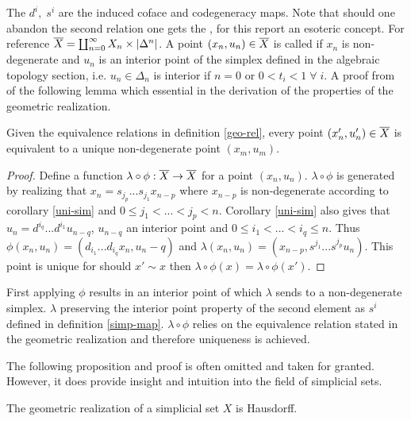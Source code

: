 \documentclass[../../main.tex]{subfiles}
\begin{document}
    The $d^i,\; s^i$ are the induced coface and codegeneracy maps. Note that should one abandon the second relation one gets the , for this report an esoteric concept. For reference $\bigGeom X = \coprod_{n=0}^{\infty} X_n \times \geom[\Delta^n]$. A point $(x_n,u_n)\in \bigGeom X$ is called  if $x_n$ is non-degenerate and $u_n$ is an interior point of the simplex defined in the algebraic topology section, i.e. $u_n\in \Delta_n$ is interior if $ n=0$ or $ 0< t_i < 1 \;\forall\; i$. A proof from \cite{simp-maye} of the following lemma which essential in the derivation of the properties of the geometric realization.

    \begin{lemma}\label{deg-rep}
        Given the equivalence relations in definition \ref{geo-rel}, every point $\left(x_n',u_n'\right)\in\bigGeom X$ is equivalent to a unique non-degenerate point $\left(x_m,u_m\right)$.
    \end{lemma}

    \begin{proof}    
        Define a function $\lambda\circ\phi:\bigGeom X \to \bigGeom X$ for a point $(x_n,u_n)$. $\lambda\circ\phi$ is generated by realizing that $x_n=s_{j_p}...s_{j_1}x_{n-p}$ where $x_{n-p}$ is non-degenerate according to corollary \ref{uni-sim} and $0\leq j_1<...<j_p<n$. Corollary \ref{uni-sim} also gives that $u_n=d^{i_q}...d^{i_1}u_{n-q}$, $u_{n-q}$ an interior point and $0\leq i_1<...<i_q\leq n$. Thus $\phi(x_n,u_n)=(d_{i_1}...d_{i_q}x_n,u_n-q)$ and $\lambda(x_n,u_n)=(x_{n-p},s^{j_1}...s^{j_p}u_n)$. This point is unique for should $x'\sim x$ then $\lambda\circ\phi(x)=\lambda\circ\phi(x')$.
    \end{proof}

    First applying $\phi$ results in an interior point of which $\lambda$ sends to a non-degenerate simplex. $\lambda$ preserving the interior point property of the second element as $s^i$ defined in definition \ref{simp-map}. $\lambda\circ\phi$ relies on the equivalence relation stated in the geometric realization and therefore uniqueness is achieved. 

    The following proposition and proof is often omitted and taken for granted. However, it does provide insight and intuition into the field of simplicial sets. 

    \begin{proposition}
        The geometric realization of a simplicial set $X$ is Hausdorff.
    \end{proposition}
\end{document}
